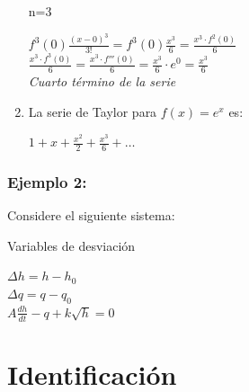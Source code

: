 \documentclass[a4paper,12pt,twoside]{proyectotanquesecci}
\begin{document}
\begin{enumerate}
	n=3
	\begin{center}
		$f^{3}\left( 0\right) \frac {\left( x-0\right) ^{3}}{3!}=f^{3}\left( 0\right) \frac {x^{3}}{6}=\frac {x^{3}\cdot f^{2}\left( 0\right) }{6}$\\
		$\frac {x^{3}\cdot f^{3}\left( 0\right) }{6}=\frac {x^{3}\cdot f'''\left( 0\right) }{6}=\frac {x^{3}}{6}\cdot e^{0}=\frac {x^{3}}{6}$\\
		\textit{ Cuarto término de la serie }\\
	\end{center}
	
\item La serie de Taylor para $f(x)=e^{x}$ es:
	\begin{center} $1+x+\frac {x^{2}}{2}+\frac {x^{3}}{6}+\ldots$ \end{center}
\end{enumerate}

\subsubsection{Ejemplo 2:}

Considere el siguiente sistema:

Variables de desviación

\begin{center}
	$\Delta h=h-h_{0}$\\
	$\Delta q=q-q_{0}$\\
	$A\frac {dh}{dt}-q+k\sqrt {h}=0$\\
\end{center}




\newpage




\section{Identificación}
\end{document}
